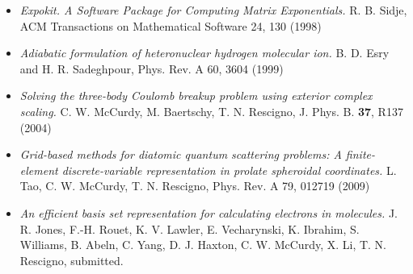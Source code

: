 \documentclass[10pt,leqno, oneside]{book}
\begin{document}
\begin{itemize}[noitemsep]
%
\item{\textit{{\sc Expokit.} {A} Software Package for Computing Matrix Exponentials.} R. B. Sidje, ACM Transactions on Mathematical Software 24, 130 (1998)}
\item{\textit{Adiabatic formulation of heteronuclear hydrogen molecular ion.} B. D. Esry and H. R. Sadeghpour, Phys. Rev. A 60, 3604 (1999)}
\item{\textit{Solving the three-body Coulomb breakup problem using exterior complex scaling.}  C. W. McCurdy, M. Baertschy, T. N. Rescigno, J. Phys. B. \textbf{37}, R137 (2004)}
\item{\textit{Grid-based methods for diatomic quantum scattering problems: A finite-element discrete-variable
representation in prolate spheroidal coordinates.}  L. Tao, C. W. McCurdy, T. N. Rescigno, Phys. Rev. A 79, 012719 (2009)}
\item{\textit{An efficient basis set representation for calculating electrons in molecules.}
J. R. Jones, F.-H. Rouet, K. V. Lawler, E. Vecharynski, 
 K. Ibrahim, S. Williams, B. Abeln, C. Yang,  D. J. Haxton, C. W. McCurdy, X. Li,  T. N. Rescigno, submitted.}        
%
\end{itemize}

\end{document}

